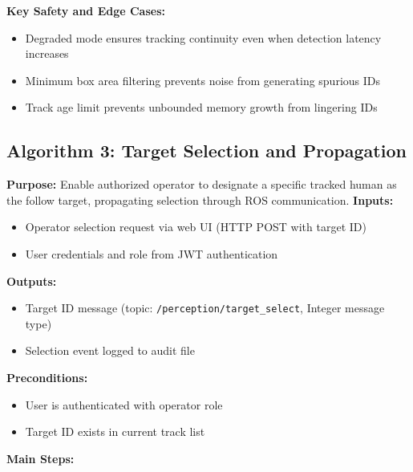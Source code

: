 \documentclass[12pt,a4paper]{report}
\begin{document}
\textbf{Key Safety and Edge Cases:}
\begin{itemize}
    \item Degraded mode ensures tracking continuity even when detection latency increases
    \item Minimum box area filtering prevents noise from generating spurious IDs
    \item Track age limit prevents unbounded memory growth from lingering IDs
\end{itemize}
\subsection{Algorithm 3: Target Selection and Propagation}
\textbf{Purpose:} Enable authorized operator to designate a specific tracked human as the follow target, propagating selection through ROS communication.
\textbf{Inputs:}
\begin{itemize}
    \item Operator selection request via web UI (HTTP POST with target ID)
    \item User credentials and role from JWT authentication
\end{itemize}
\textbf{Outputs:}
\begin{itemize}
    \item Target ID message (topic: \texttt{/perception/target\_select}, Integer message type)
    \item Selection event logged to audit file
\end{itemize}
\textbf{Preconditions:}
\begin{itemize}
    \item User is authenticated with operator role
    \item Target ID exists in current track list
\end{itemize}
\textbf{Main Steps:}
\end{document}
